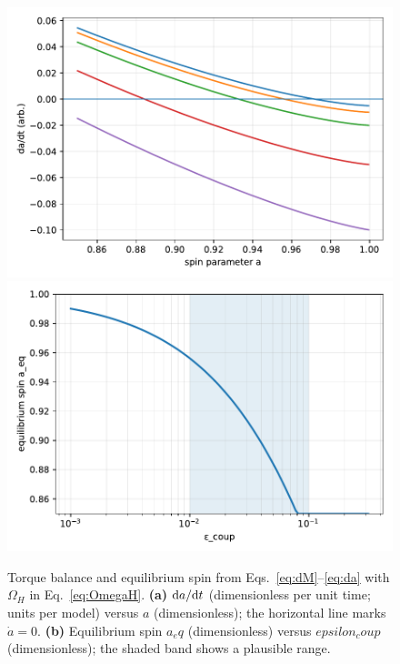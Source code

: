 \documentclass[twocolumn]{aastex701}
\newenvironment{CrowdedFloats}{%
  \begingroup
  \setcounter{topnumber}{1}%
  \setcounter{totalnumber}{2}%
}{\endgroup}
\newcommand{\epscoup}{\epsilon_{\rm coup}}
\newcommand{\aeq}{a_{\rm eq}}
\def\epscoup{epsilon_coup}\def\aeq{a_eq}\def\mathrm#1{#1}%
\begin{document}
\begin{CrowdedFloats}
\begin{figure}[!htbp]
  \vspace*{2pt}
  \centering
  \includegraphics[width=.95\linewidth]{Fig3a.pdf}\\[4pt]
  \includegraphics[width=.95\linewidth]{Fig3b.pdf}
  \caption{Torque balance and equilibrium spin from Eqs.~\eqref{eq:dM}--\eqref{eq:da} with $\Omega_H$ in Eq.~\eqref{eq:OmegaH}. \textbf{(a)} ${\rm d}a/{\rm d}t$ (dimensionless per unit time; units per model) versus $a$ (dimensionless); the horizontal line marks $\dot a=0$. \textbf{(b)} Equilibrium spin $\aeq$ (dimensionless) versus $\epscoup$ (dimensionless); the shaded band shows a plausible range.}
  \label{fig:fig3}
\end{figure}


\end{CrowdedFloats}
\end{document}
